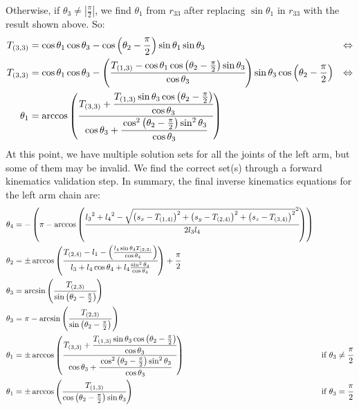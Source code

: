 Otherwise, if $\theta_3 \neq \left|\frac{\pi}{2}\right|$, we find $\theta_1$ from $r_{33}$ after replacing $\sin\theta_1$ in $r_{33}$ with the result shown above. So:
\begin{align*}
T_{(3,3)} &= \cos\theta_1\cos\theta_3 - \cos\left(\theta_2 - \frac{\pi}{2}\right)\sin\theta_1\sin\theta_3 &\Leftrightarrow \\
T_{(3,3)} &= \cos\theta_1\cos\theta_3 - \left(\cfrac{T_{(1,3)} - \cos\theta_1\cos\left(\theta_2 - \frac{\pi}{2}\right)\sin\theta_3}{\cos\theta_3}\right)\sin\theta_3\cos\left(\theta_2 - \frac{\pi}{2}\right) &\Leftrightarrow \\
\theta_1 &= \arccos\left(\cfrac{T_{(3,3)} +\cfrac{ T_{(1,3)}\sin\theta_3\cos\left(\theta_2 - \frac{\pi}{2}\right)}{\cos\theta_3}}{\cos\theta_3 + \cfrac{\cos^2\left(\theta_2-\frac{\pi}{2}\right)\sin^2\theta_3}{\cos\theta_3}}\right)
\end{align*}
At this point, we have multiple solution sets for all the joints of the left arm, but some of them may be invalid. We find the correct set(s) through a forward kinematics validation step. In summary, the final inverse kinematics equations for the left arm chain are:
\begin{align*}
\theta_4 &= -\left(\pi - \arccos\left(\cfrac{{l_3}^2 + {l_4}^2 - \sqrt{\left(s_x-T_{(1,4)}\right)^2 + \left(s_y-T_{(2,4)}\right)^2 + \left(s_z-T_{(3,4)}\right)^2}^2 }{2 l_3 l_4}\right)\right)\\
\theta_2 &= \pm\arccos\left(\cfrac{T_{(2,4)} - l_1 - \left(\frac{l_4\sin\theta_4 T_{(2,2)}}{\cos\theta_4}\right)}{l_3 +l_4\cos\theta_4 + l_4\frac{\sin^2\theta_4}{\cos\theta_4}}\right)+\cfrac{\pi}{2}\\
\theta_3 &= \arcsin\left(\cfrac{T_{(2,3)}}{\sin\left(\theta_2-\frac{\pi}{2}\right)}\right)\\
\theta_3 &= \pi - \arcsin\left(\frac{T_{(2,3)}}{\sin\left(\theta_2-\frac{\pi}{2}\right)}\right)\\
\theta_1 &= \pm\arccos\left(\cfrac{T_{(3,3)} + \cfrac{T_{(1,3)}\sin\theta_3\cos\left(\theta_2 - \frac{\pi}{2}\right)}{\cos\theta_3}}{\cos\theta_3 + \cfrac{\cos^2\left(\theta_2-\frac{\pi}{2}\right)\sin^2\theta_3}{\cos\theta_3}}\right) &\text{if } \theta_3 \neq \cfrac{\pi}{2}\\
\theta_1 &= \pm\arccos\left(\cfrac{T_{(1,3)}}{\cos\left(\theta_2 - \frac{\pi}{2}\right)\sin\theta_3}\right) &\text{if } \theta_3 = \cfrac{\pi}{2}
\end{align*}



